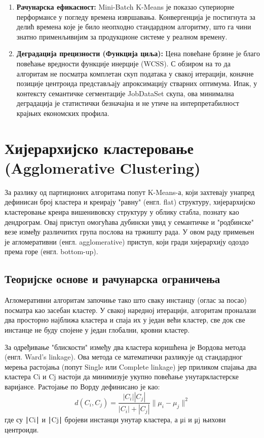 \documentclass[a4paper,12pt]{report}
\begin{document}
	\begin{enumerate}
	\item \textbf{Рачунарска ефикасност:} Mini-Batch K-Means је показао супериорне перформансе у погледу времена извршавања. Конвергенција је постигнута за делић времена које је било неопходно стандардном алгоритму, што га чини знатно применљивијим за продукционе системе у реалном времену.
	
	\item \textbf{Деградација прецизности (Функција циља):} Цена повећане брзине је благо повећање вредности функције инерције (WCSS). С обзиром на то да алгоритам не посматра комплетан скуп података у свакој итерацији, коначне позиције центроида представљају апроксимацију стварних оптимума. Ипак, у контексту семантичке сегментације JobDataSet скупа, ова минимална деградација је статистички безначајна и не утиче на интерпретабилност крајњих економских профила.
	
	\end{enumerate}
	
	\section{Хијерархијско кластеровање (Agglomerative Clustering)}
	За разлику од партиционих алгоритама попут K-Means-а, који захтевају унапред дефинисан број кластера и креирају "равну" (енгл. flat) структуру, хијерархијско кластеровање креира вишенивовску структуру у облику стабла, познату као дендрограм. Овај приступ омогућава дубински увид у семантичке и "родбинске" везе између различитих група послова на тржишту рада. У овом раду примењен је агломеративни (енгл. agglomerative) приступ, који гради хијерархију одоздо према горе (енгл. bottom-up).
	
	\subsection{Теоријске основе и рачунарска ограничења}
	Агломеративни алгоритам започиње тако што сваку инстанцу (оглас за посао) посматра као засебан кластер. У свакој наредној итерацији, алгоритам проналази два просторно најближа кластера и спаја их у један већи кластер, све док све инстанце не буду спојене у један глобални, кровни кластер.
	
	За одређивање "блискости" између два кластера коришћена је Вордова метода (енгл. Ward's linkage). Ова метода се математички разликује од стандардног мерења растојања (попут Single или Complete linkage) јер приликом спајања два кластера Ci​ и Cj​ настоји да минимизује укупно повећање унутаркластерске варијансе. Растојање по Ворду дефинисано је као:
	$$ d(C_i, C_j) = \frac{|C_i| |C_j|}{|C_i| + |C_j|} \|\mu_i - \mu_j\|^2 $$
	где су ∣Ci​∣ и ∣Cj​∣ бројеви инстанци унутар кластера, а μi​ и μj​ њихови центроиди.
	
\end{document}
